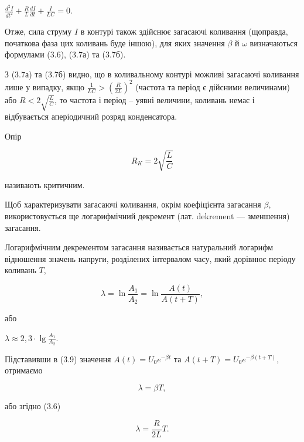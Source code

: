 \documentclass[12pt,a4paper]{article}
\begin{document}
    \begin{center}
        $\displaystyle \frac{d^2I}{dt^2} + \frac{R}{L} \frac{dI}{dt} + \frac{I}{LC} = 0$.
    \end{center}

    Отже, сила струму $I$ в контурі також здійснює загасаючі коливання (щоправда, початкова фаза цих коливань буде іншою),
    для яких значення $\beta$ й $\omega$ визначаються формулами (3.6), (3.7а) та (3.7б).

    З (3.7а) та (3.7б) видно, що в коливальному контурі можливі загасаючі коливання лише у випадку,
    якщо $\displaystyle \frac{1}{LC} > \left( \frac{R}{2L}\right)^2$ (частота та період є дійсними величинами)
    або $\displaystyle R < 2\sqrt{\frac{L}{C}}$, то частота і період – уявні величини, коливань немає і відбувається
    аперіодичний розряд конденсатора.

    Опір

    \begin{equation}
        R_K = 2\sqrt{\frac{L}{C}}
        \tag{3.8}
    \end{equation}

    називають критичним.

    Щоб характеризувати загасаючі коливання, окрім коефіцієнта загасання $\beta$,
    використовується ще логарифмічний декремент (лат. dekrement --- зменшення) загасання.

    Логарифмічним декрементом загасання називається натуральний логарифм
    відношення значень напруги, розділених інтервалом часу,
    який дорівнює періоду коливань $T$,

    \begin{equation}
        \lambda = \ln \frac{A_1}{A_2} = \ln \frac{A(t)}{A(t+T)},
        \tag{3.9}
    \end{equation}

    або

    \begin{center}
        $\displaystyle \lambda \approx 2,3\cdot \lg \frac{A_1}{A_2}$.
    \end{center}

    Підставивши в (3.9) значення $A(t) = U_0e^{-\beta t}$ та $A(t+T) = U_0e^{-\beta (t+T)}$, отримаємо

    \begin{equation}
        \lambda = \beta T,
        \tag{3.10}
    \end{equation}

    або згідно (3.6)

    \begin{equation}
        \lambda = \frac{R}{2L}T.
        \tag{3.10а}
    \end{equation}
\end{document}
